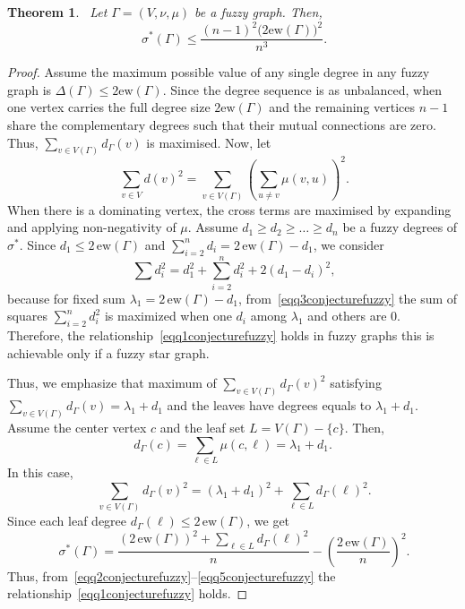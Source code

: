 \documentclass[12pt]{amsart}
\newtheorem{theorem}{Theorem}[section]
\newcommand{\ew}{\mathrm{ew}}
\newcommand{\SF}{\sigma^*}
\begin{document}
\begin{theorem}~\label{conjecturefuzzy}
Let $\Gamma=(V, \nu,\mu)$ be a fuzzy graph. Then,
\begin{equation}~\label{eqq1conjecturefuzzy}
\SF(\Gamma) \leqslant \dfrac{(n-1)^2 \Big(2\ew(\Gamma)\Big)^2}{n^3}.
\end{equation}
\end{theorem}
\begin{proof}
Assume the maximum possible value of any single degree in any fuzzy graph is $\Delta(\Gamma)\leqslant  2\ew(\Gamma)$. Since the degree sequence is as unbalanced, when one vertex carries the full degree size  $2\ew(\Gamma)$ and the remaining vertices $n-1$ share the complementary degrees such that their mutual connections are zero. Thus, $\sum_{v\in V(\Gamma)}d_\Gamma(v)$ is maximised. Now, let 
\begin{equation}~\label{eqq2conjecturefuzzy}
\sum_{v\in V} d(v)^2 = \sum_{v\in V(\Gamma)}\left(\sum_{u\ne v}\mu(v,u)\right)^2.
\end{equation}
When there is a dominating vertex, the cross terms are maximised by expanding and applying non-negativity of $\mu$. Assume $d_1\geqslant d_2\geqslant \dots \geqslant d_n$ be a fuzzy degrees of $\SF$. Since  $d_1\leqslant 2\,\ew(\Gamma)$
and $\sum_{i=2}^n d_i=2\,\ew(\Gamma)-d_1$, we consider 
\begin{equation}~\label{eqq3conjecturefuzzy}
\sum d_i^2 = d_1^2 + \sum_{i=2}^n d_i^2 + 2(d_1 - d_i)^2,
\end{equation}
because for fixed sum $\lambda_1=2\,\ew(\Gamma)-d_1$, from~\eqref{eqq3conjecturefuzzy} the sum of squares $\sum_{i=2}^n d_i^2$ is
maximized when one $d_i$ among $\lambda_1$ and others are $0$. Therefore, the relationship~\eqref{eqq1conjecturefuzzy} holds in fuzzy graphs this is achievable only if a fuzzy star graph.

Thus, we emphasize that maximum of $\sum_{v\in V(\Gamma)}d_\Gamma(v)^2$ satisfying $\sum_{v\in V(\Gamma)}d_\Gamma(v)=\lambda_1+d_1$ and the leaves have degrees equals to $\lambda_1+d_1$. 
Assume the center vertex $c$ and the leaf set $L=V(\Gamma)-\{c\}$. Then, 
\[
d_\Gamma(c)=\sum_{\ell\in L}\mu(c,\ell)=\lambda_1+d_1.
\]
In this case,
\begin{equation}~\label{eqq4conjecturefuzzy}
\sum_{v\in V(\Gamma)}d_\Gamma(v)^2=\left(\lambda_1+d_1\right)^2+\sum_{\ell \in L} d_\Gamma(\ell)^2.
\end{equation}
Since each leaf degree $d_\Gamma(\ell)\leqslant 2\,\ew(\Gamma)$, we get
\begin{equation}~\label{eqq5conjecturefuzzy}
\SF(\Gamma)= \frac{(2\,\ew(\Gamma))^2 + \sum_{\ell \in L} d_\Gamma(\ell)^2}{n} - \left(\frac{2\,\ew(\Gamma)}{n}\right)^2.
\end{equation}
Thus, from~\eqref{eqq2conjecturefuzzy}--\eqref{eqq5conjecturefuzzy} the relationship~\eqref{eqq1conjecturefuzzy} holds.
\end{proof}
\end{document}
